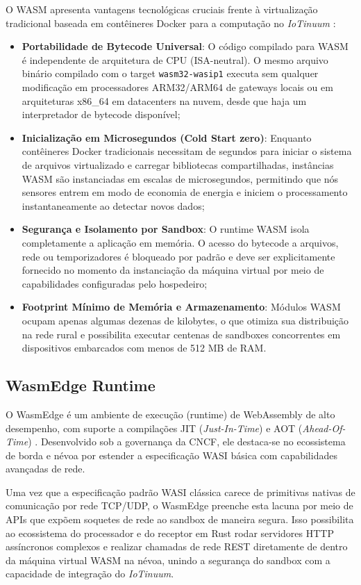 \documentclass[
	12pt,
	openright,
	oneside,
	a4paper,
	english,
	brazil
	]{abntex2}
\begin{document}
O WASM apresenta vantagens tecnológicas cruciais frente à virtualização tradicional baseada em contêineres Docker para a computação no \textit{IoTinuum} \cite{guan2022wasm}:
\begin{itemize}
    \item \textbf{Portabilidade de Bytecode Universal}: O código compilado para WASM é independente de arquitetura de CPU (ISA-neutral). O mesmo arquivo binário compilado com o target \texttt{wasm32-wasip1} executa sem qualquer modificação em processadores ARM32/ARM64 de gateways locais ou em arquiteturas x86\_64 em datacenters na nuvem, desde que haja um interpretador de bytecode disponível;
    \item \textbf{Inicialização em Microsegundos (Cold Start zero)}: Enquanto contêineres Docker tradicionais necessitam de segundos para iniciar o sistema de arquivos virtualizado e carregar bibliotecas compartilhadas, instâncias WASM são instanciadas em escalas de microsegundos, permitindo que nós sensores entrem em modo de economia de energia e iniciem o processamento instantaneamente ao detectar novos dados;
    \item \textbf{Segurança e Isolamento por Sandbox}: O runtime WASM isola completamente a aplicação em memória. O acesso do bytecode a arquivos, rede ou temporizadores é bloqueado por padrão e deve ser explicitamente fornecido no momento da instanciação da máquina virtual por meio de capabilidades configuradas pelo hospedeiro;
    \item \textbf{Footprint Mínimo de Memória e Armazenamento}: Módulos WASM ocupam apenas algumas dezenas de kilobytes, o que otimiza sua distribuição na rede rural e possibilita executar centenas de sandboxes concorrentes em dispositivos embarcados com menos de 512 MB de RAM.
\end{itemize}

\subsection{WasmEdge Runtime}

O WasmEdge é um ambiente de execução (runtime) de WebAssembly de alto desempenho, com suporte a compilações JIT (\textit{Just-In-Time}) e AOT (\textit{Ahead-Of-Time}) \cite{wasmedge2023}. Desenvolvido sob a governança da CNCF, ele destaca-se no ecossistema de borda e névoa por estender a especificação WASI básica com capabilidades avançadas de rede. 

Uma vez que a especificação padrão WASI clássica carece de primitivas nativas de comunicação por rede TCP/UDP, o WasmEdge preenche esta lacuna por meio de APIs que expõem soquetes de rede ao sandbox de maneira segura. Isso possibilita ao ecossistema do processador e do receptor em Rust rodar servidores HTTP assíncronos complexos e realizar chamadas de rede REST diretamente de dentro da máquina virtual WASM na névoa, unindo a segurança do sandbox com a capacidade de integração do \textit{IoTinuum}.
\end{document}
